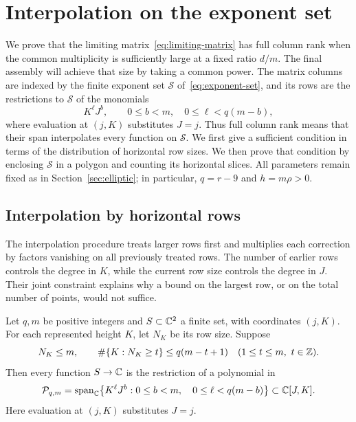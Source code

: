 \section{Interpolation on the exponent set}
\label{sec:interpolation}

We prove that the limiting matrix~\eqref{eq:limiting-matrix} has full
column rank when the common multiplicity is sufficiently large at a
fixed ratio $d/m$. The final assembly will achieve that size by taking
a common power. The matrix columns are indexed by the finite exponent set
$\mathcal S$ of~\eqref{eq:exponent-set}, and its rows are the
restrictions to $\mathcal S$ of the monomials
\[
 K^\ell J^b,\qquad 0\le b<m,\quad 0\le\ell<q(m-b),
\]
where evaluation at $(j,K)$ substitutes $J=j$. Thus full column rank
means that their span interpolates every function on $\mathcal S$.
We first give a sufficient condition in terms of the distribution of
horizontal row sizes. We then prove that condition by enclosing
$\mathcal S$ in a polygon and counting its horizontal slices.
All parameters remain fixed as in Section~\ref{sec:elliptic}; in
particular, $q=r-9$ and $h=m\rho>0$.

\subsection{Interpolation by horizontal rows}

The interpolation procedure treats larger rows first and multiplies
each correction by factors vanishing on all previously treated rows.
The number of earlier rows controls the degree in $K$, while the
current row size controls the degree in $J$. Their joint constraint
explains why a bound on the largest row, or on the total number of
points, would not suffice.

\begin{lemma}\label{lem:interpolation}
Let $q,m$ be positive integers and $S\subset\mathbb C^2$ a finite set,
with coordinates $(j,K)$. For each represented height $K$, let $N_K$
be its row size. Suppose
\[
 N_K\le m,\qquad
 \#\{K:N_K\ge t\}\le q(m-t+1)
 \quad(1\le t\le m,\ t\in\mathbb Z).
\]
Then every function $S\to\mathbb C$ is the restriction of a polynomial in
\[
 \mathcal P_{q,m}
 =\operatorname{span}_{\mathbb C}
 \bigl\{K^\ell J^b:0\le b<m,\quad0\le\ell<q(m-b)\bigr\}
 \subset\mathbb C[J,K].
\]
Here evaluation at $(j,K)$ substitutes $J=j$.
\end{lemma}

